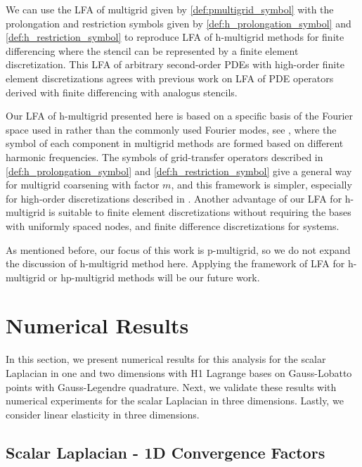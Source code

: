 \documentclass[review]{siamart190516}
\begin{document}
We can use the LFA of multigrid given by  \cref{def:pmultigrid_symbol} with the prolongation and restriction symbols given by \cref{def:h_prolongation_symbol} and  \cref{def:h_restriction_symbol} to reproduce LFA of h-multigrid methods for finite differencing where the stencil can be represented by a finite element discretization.
This LFA of arbitrary second-order PDEs with high-order finite element discretizations agrees with previous work on LFA of PDE operators derived with finite differencing with analogus stencils.

Our LFA of h-multigrid presented here is based on a specific basis of the Fourier space used in \cite{kumar2019local} rather than the commonly used Fourier modes, see \cite{MR1807961,wienands2004practical}, where the symbol of each component in multigrid methods are formed based on different harmonic frequencies.
The symbols of grid-transfer operators described in \cref{def:h_prolongation_symbol} and  \cref{def:h_restriction_symbol} give a general way for multigrid coarsening with factor $m$, and this framework is simpler, especially for high-order discretizations described in \cite{he2020two}.
Another advantage of our LFA for h-multigrid is suitable to  finite element discretizations without requiring the bases with uniformly spaced nodes, and finite difference discretizations for systems.

As mentioned before, our focus of this work is p-multigrid,  so we do not expand the discussion of h-multigrid method here.
Applying the framework of LFA for h-multigrid or hp-multigrid methods will be our future work.
  
\section{Numerical Results}\label{sec:results}

In this section, we present numerical results for this analysis for the scalar Laplacian in one and two dimensions with H1 Lagrange bases on Gauss-Lobatto points with Gauss-Legendre quadrature.
Next, we validate these results with numerical experiments for the scalar Laplacian in three dimensions.
Lastly, we consider linear elasticity in three dimensions.

\subsection{Scalar Laplacian - 1D Convergence Factors}\label{sec:1dresults}
\end{document}
